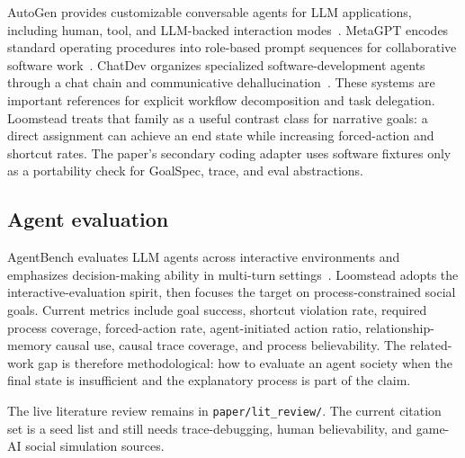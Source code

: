 AutoGen provides customizable conversable agents for LLM applications, including human, tool, and LLM-backed interaction modes~\cite{wu2023autogen}. MetaGPT encodes standard operating procedures into role-based prompt sequences for collaborative software work~\cite{hong2024metagpt}. ChatDev organizes specialized software-development agents through a chat chain and communicative dehallucination~\cite{qian2024chatdev}. These systems are important references for explicit workflow decomposition and task delegation. Loomstead treats that family as a useful contrast class for narrative goals: a direct assignment can achieve an end state while increasing forced-action and shortcut rates. The paper's secondary coding adapter uses software fixtures only as a portability check for GoalSpec, trace, and eval abstractions.

\subsection{Agent evaluation}

AgentBench evaluates LLM agents across interactive environments and emphasizes decision-making ability in multi-turn settings~\cite{liu2024agentbench}. Loomstead adopts the interactive-evaluation spirit, then focuses the target on process-constrained social goals. Current metrics include goal success, shortcut violation rate, required process coverage, forced-action rate, agent-initiated action ratio, relationship-memory causal use, causal trace coverage, and process believability. The related-work gap is therefore methodological: how to evaluate an agent society when the final state is insufficient and the explanatory process is part of the claim.

The live literature review remains in \texttt{paper/lit\_review/}. The current citation set is a seed list and still needs trace-debugging, human believability, and game-AI social simulation sources.
